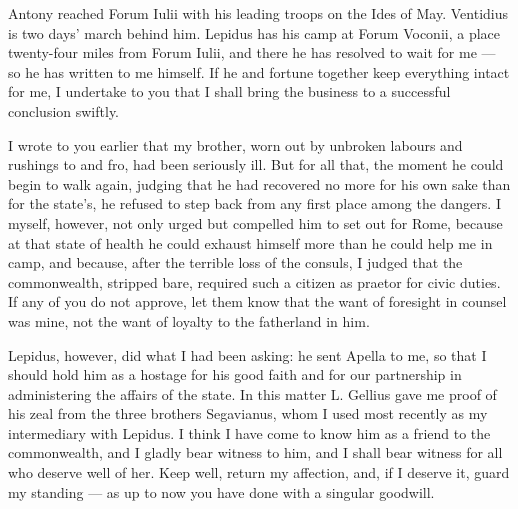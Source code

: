 

 Antony reached Forum Iulii with his leading troops on the Ides of May. Ventidius is two days' march behind him. Lepidus has his camp at Forum Voconii, a place twenty-four miles from Forum Iulii, and there he has resolved to wait for me --- so he has written to me himself. If he and fortune together keep everything intact for me, I undertake to you that I shall bring the business to a successful conclusion swiftly.

 I wrote to you earlier that my brother, worn out by unbroken labours and rushings to and fro, had been seriously ill. But for all that, the moment he could begin to walk again, judging that he had recovered no more for his own sake than for the state's, he refused to step back from any first place among the dangers. I myself, however, not only urged but compelled him to set out for Rome, because at that state of health he could exhaust himself more than he could help me in camp, and because, after the terrible loss of the consuls, I judged that the commonwealth, stripped bare, required such a citizen as praetor for civic duties. If any of you do not approve, let them know that the want of foresight in counsel was mine, not the want of loyalty to the fatherland in him.

 Lepidus, however, did what I had been asking: he sent Apella to me, so that I should hold him as a hostage for his good faith and for our partnership in administering the affairs of the state. In this matter L. Gellius gave me proof of his zeal \dag{}from the three brothers Segavianus,\dag{} whom I used most recently as my intermediary with Lepidus. I think I have come to know him as a friend to the commonwealth, and I gladly bear witness to him, and I shall bear witness for all who deserve well of her. Keep well, return my affection, and, if I deserve it, guard my standing --- as up to now you have done with a singular goodwill.
